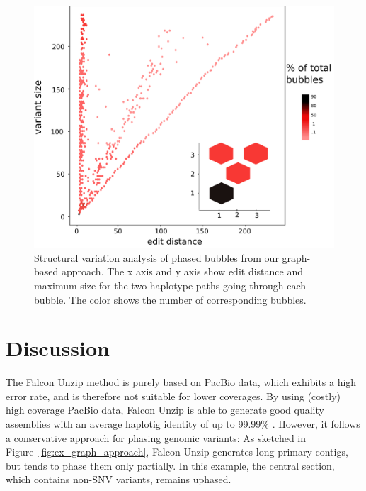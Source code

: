 \begin{figure}[t!]\centering
\includegraphics[width=\columnwidth]{wh_bubbles.pdf}
\caption{Structural variation analysis of phased bubbles from our graph-based approach. The x axis and y axis show edit distance and maximum size for the two haplotype paths going through each bubble. The color shows the number of corresponding bubbles.}
\label{fig:sv_scatter}
\end{figure}


\section{Discussion}
The Falcon Unzip method \citep{chin2016phased} is purely based on PacBio data, which exhibits a high error rate, and is therefore not suitable for lower coverages.
By using (costly) high coverage PacBio data, Falcon Unzip is able to generate good quality assemblies with an average haplotig identity of up to 99.99\% \citep{chin2016phased}.
However, it follows a conservative approach for phasing genomic variants:
As sketched in Figure~\ref{fig:ex_graph_approach}, Falcon Unzip generates long primary contigs, but tends to phase them only partially.
In this example, the central section, which contains non-SNV variants, remains uphased.

